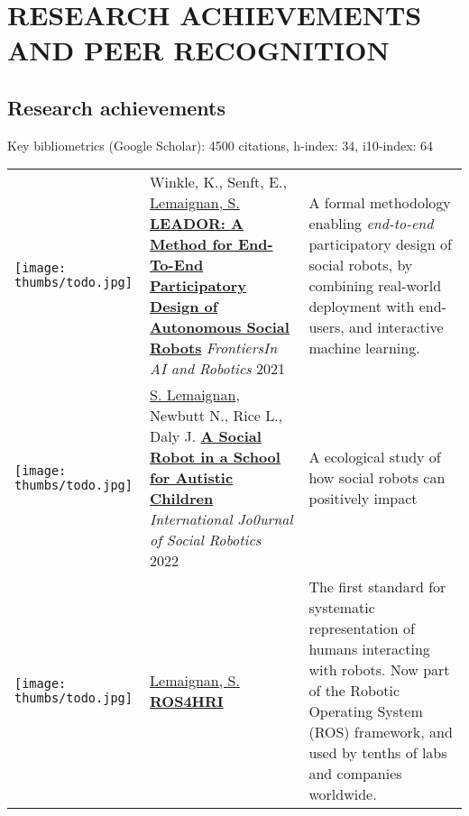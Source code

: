 \section{RESEARCH ACHIEVEMENTS AND PEER RECOGNITION}

\subsection{Research achievements}

Key bibliometrics (Google Scholar): 4500 citations, h-index: 34, i10-index: 64


\hspace*{-0.5cm}\begin{tabular}{p{1.7cm}p{7cm}p{8cm}}

    \vspace{-0.2cm}\texttt{[image: thumbs/todo.jpg]} &
    Winkle, K., Senft, E., \ul{Lemaignan, S.}
    \newline\href{}{\textbf{LEADOR: A Method for End-To-End Participatory Design of Autonomous Social Robots}}
    \newline \textit{FrontiersIn AI and Robotics} 2021
    & \small A formal methodology enabling \emph{end-to-end} participatory
    design of social robots, by combining real-world deployment with end-users,
    and interactive machine learning.\textbf{} \\

    \vspace{-0.2cm}\texttt{[image: thumbs/todo.jpg]} &
    \ul{S. Lemaignan}, Newbutt N., Rice L., Daly J.
    \newline\href{https://doi.org/10.1007/s12369-022-00928-4}{\textbf{A Social Robot in a School for Autistic Children}}
    \newline \textit{International Jo0urnal of Social Robotics} 2022
    & \small A ecological study of how social robots can positively impact \textbf{} \\






    \vspace{-0.2cm}\texttt{[image: thumbs/todo.jpg]} &
    \ul{Lemaignan, S.}
    \newline\href{https://wiki.ros.org/hri}{\textbf{ROS4HRI}}
    \newline 2022
    & \small The first standard for systematic representation of humans
    interacting with robots. Now part of the Robotic Operating System (ROS)
    framework, and used by tenths of labs and companies worldwide. \textbf{} \\



\end{tabular}
